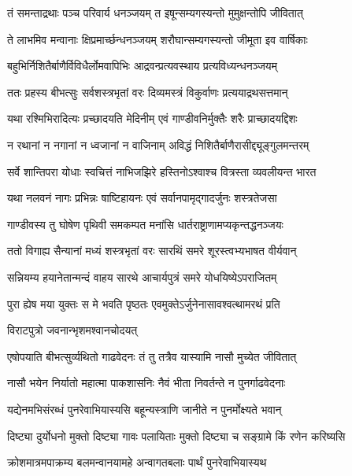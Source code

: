 
\twolineshloka
{तं समन्ताद्रथाः पञ्च परिवार्य धनञ्जयम्}
{त इषून्सम्यगस्यन्तो मुमुक्षन्तोपि जीवितात्}


\twolineshloka
{ते लाभमिव मन्वानाः क्षिप्रमार्च्छन्धनञ्जयम्}
{शरौघान्सम्यगस्यन्तो जीमूता इव वार्षिकाः}


\twolineshloka
{बहुभिर्निशितैर्बाणैर्विविधैर्लोमवापिभिः}
{आद्रवन्प्रत्यवस्थाय प्रत्यविध्यन्धनञ्जयम्}


\twolineshloka
{ततः प्रहस्य बीभत्सुः सर्वशस्त्रभृतां वरः}
{दिव्यमस्त्रं विकुर्वाणः प्रत्ययाद्रथसत्तमान्}


\twolineshloka
{यथा रश्मिभिरादित्यः प्रच्छादयति मेदिनीम्}
{एवं गाण्डीवनिर्मुक्तैः शरैः प्राच्छादयद्दिशः}


\twolineshloka
{न रथानां न नगानां न ध्वजानां न वाजिनाम्}
{अविद्धं निशितैर्बाणैरासीद्द्यूङ्गुलमन्तरम्}


\twolineshloka
{सर्वे शान्तिपरा योधाः स्वचित्तं नाभिजझिरे}
{हस्तिनोऽश्वाश्च वित्रस्ता व्यवलीयन्त भारत}


\twolineshloka
{यथा नलवनं नागः प्रभिन्नः षाष्टिहायनः}
{एवं सर्वानपामृद्गादर्जुनः शस्त्रतेजसा}


\twolineshloka
{गाण्डीवस्य तु घोषेण पृथिवी समकम्पत}
{मनांसि धार्तराष्ट्राणामप्यकृन्तद्धनञ्जयः}


\twolineshloka
{ततो विगाह्य सैन्यानां मध्यं शस्त्रभृतां वरः}
{सारथिं समरे शूरस्त्वभ्यभाषत वीर्यवान्}


\twolineshloka
{सन्नियम्य हयानेतान्मन्दं वाहय सारथे}
{आचार्यपुत्रं समरे योधयिष्येऽपराजितम्}


\twolineshloka
{पुरा ह्येष मया युक्तः स मे भवति पृष्ठतः}
{एवमुक्तेऽर्जुनेनासावश्वत्थामरथं प्रति}


\onelineshloka
{विराटपुत्रो जवनान्भृशमश्वानचोदयत्}




\twolineshloka
{एषोपयाति बीभत्सुर्व्यथितो गाढवेदनः}
{तं तु तत्रैव यास्यामि नासौ मुच्येत जीवितात्}




\twolineshloka
{नासौ भयेन निर्यातो महात्मा पाकशासनिः}
{नैवं भीता निवर्तन्ते न पुनर्गाढवेदनाः}


\twolineshloka
{यद्येनमभिसंरब्धं पुनरेवाभियास्यसि}
{बहून्यस्त्राणि जानीते न पुनर्मोक्ष्यते भवान्}


\twolineshloka
{दिष्ट्या दुर्योधनो मुक्तो दिष्ट्या गावः पलायिताः}
{मुक्तो दिष्ट्या च सङ्ग्रामे किं रणेन करिष्यसि}


\twolineshloka
{क्रोशमात्रमपाक्रम्य बलमन्वानयामहे}
{अन्वागतबलाः पार्थं पुनरेवाभियास्यथ}

